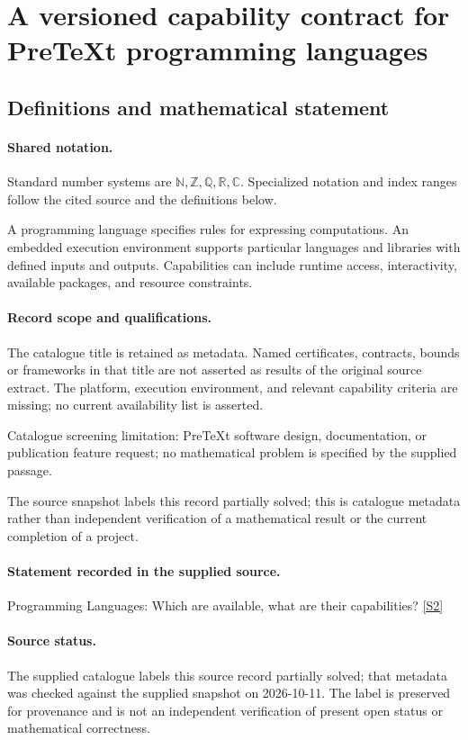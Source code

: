 \documentclass[11pt]{article}
\newcommand{\sref}[2]{\hyperlink{source:#1:#2}{[S#2]}}
\begin{document}
\section{A versioned capability contract for PreTeXt programming languages}\label{statement}

\subsection{Definitions and mathematical statement}

\paragraph{Shared notation.}Standard number systems are $\mathbb N,\mathbb Z,\mathbb Q,\mathbb R,\mathbb C$. Specialized notation and index ranges follow the cited source and the definitions below.


A programming language specifies rules for expressing computations. An embedded execution environment supports particular languages and libraries with defined inputs and outputs. Capabilities can include runtime access, interactivity, available packages, and resource constraints.
\paragraph{Record scope and qualifications.}
The catalogue title is retained as metadata. Named certificates, contracts, bounds or frameworks in that title are not asserted as results of the original source extract.
The platform, execution environment, and relevant capability criteria are missing; no current availability list is asserted.

Catalogue screening limitation: PreTeXt software design, documentation, or publication feature request; no mathematical problem is specified by the supplied passage.

The source snapshot labels this record partially solved; this is catalogue metadata rather than independent verification of a mathematical result or the current completion of a project.
\paragraph{Statement recorded in the supplied source.}
Programming Languages: Which are available, what are their capabilities? \sref{statement}{2}
\paragraph{Source status.}
The supplied catalogue labels this source record partially solved; that metadata was checked against the supplied snapshot on 2026-10-11. The label is preserved for provenance and is not an independent verification of present open status or mathematical correctness.
\end{document}
